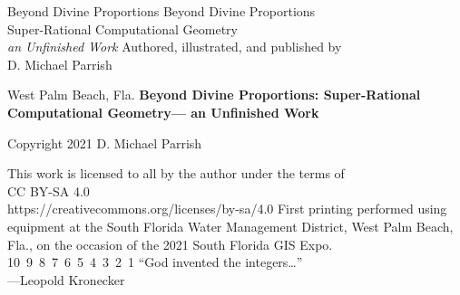 \documentclass{letter}
\begin{document}
{\Huge Beyond Divine Proportions}
\newpage
\phantom{N}
\newpage
{\huge Beyond Divine Proportions}\\
{\Large Super-Rational Computational Geometry\\
\textit{an Unfinished Work}}
\vfill
Authored, illustrated, and published by\\
D. Michael Parrish

West Palm Beach, Fla.
\newpage
\textbf{Beyond Divine Proportions:
Super-Rational Computational Geometry---
an Unfinished Work}

Copyright 2021 D. Michael Parrish

This work is licensed to all by the author under the terms of\\
CC BY-SA 4.0\\
https://creativecommons.org/licenses/by-sa/4.0
\vfill
\phantom{M} First printing performed using equipment at the South Florida Water Management District, West Palm Beach, Fla.,
on the occasion of the 2021 South Florida GIS Expo.\\
10\ 9\ 8\ 7\ 6\ 5\ 4\ 3\ 2\ 1
\newpage
\hfill ``God invented the integers\ldots''\\
\phantom{N}\hfill ---Leopold Kronecker
\end{document}
